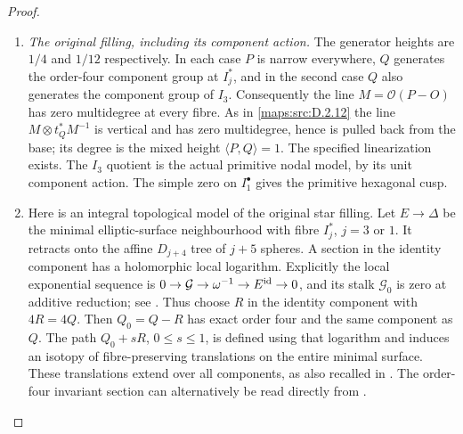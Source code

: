 \begin{proof}
\begin{enumerate}[label=\arabic*.,leftmargin=*]
\item \emph{The original filling, including its component action.}
The generator heights are $1/4$ and $1/12$ respectively.
In each case $P$ is narrow everywhere, $Q$ generates the
order-four component group at $I_j^*$, and in the second
case $Q$ also generates the component group of $I_3$.
Consequently the line $M=\mathcal O(P-O)$ has zero
multidegree at every fibre. As in \ref{maps:src:D.2.12} the line
$M\otimes t_Q^*M^{-1}$ is vertical and has zero multidegree,
hence is pulled back from the base; its degree is the mixed
height $\langle P,Q\rangle=1$. The specified linearization
exists. The $I_3$ quotient is the actual primitive nodal
model, by its unit component action. The simple zero on
$I_1^\bullet$ gives the primitive hexagonal cusp.

\item Here is an integral topological model of the original star
filling. Let $E\to\Delta$ be the minimal elliptic-surface
neighbourhood with fibre $I_j^*$, $j=3$ or $1$.
It retracts onto the affine $D_{j+4}$ tree of $j+5$ spheres.
A section in the identity component has a holomorphic local
logarithm. Explicitly the local exponential sequence is
$0\to\mathcal G\to\omega^{-1}\to E^{\rm id}\to0$,
and its stalk $\mathcal G_0$ is zero at additive reduction;
see \cite[Section 2.4, (2.2)]{manUU21}.
Thus choose $R$ in the identity component with $4R=4Q$.
Then $Q_0=Q-R$ has exact order four and the same component
as $Q$. The path $Q_0+sR$, $0\le s\le1$, is defined using
that logarithm and induces an isotopy of fibre-preserving
translations on the entire minimal surface. These
translations extend over all components, as also recalled in
\cite[Sections 7.6--7.7]{manSS10}. The order-four invariant
section can alternatively be read directly from
\cite[Proposition 3.5(1),(3) and its proof]{manUU21}.


\end{enumerate}
\end{proof}
